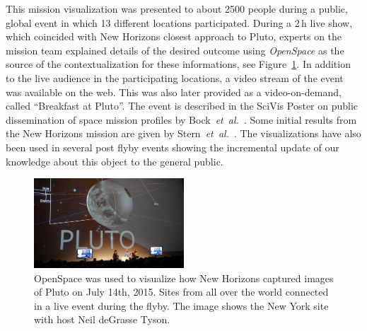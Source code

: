 \documentclass[journal]{vgtc}                %
\newcommand{\alexcomment}[1]{\textbf{[-Alex-~}
    \textcolor{magenta}{#1}
    \textbf{~]}}
\newcommand{\fig}[1]{Figure~\ref{fig:#1}}
\newcommand{\etal}{\emph{et~al.}}
\begin{document}
This mission visualization was presented to about 2500 people during a public, global event in which 13 different locations participated.
During a 2\,h live show, which coincided with New Horizons closest approach to Pluto, experts on the mission team explained details of the desired outcome using \emph{OpenSpace} as the source of the contextualization for these informations, see \fig{frustum_mars}.
In addition to the live audience in the participating locations, a video stream of the event was available on the web. This was also later provided as a video-on-demand, called ``Breakfast at Pluto''.
The event is described in the SciVis Poster on public dissemination of space mission profiles by Bock~\etal~\cite{Bock_2015}.
Some initial results from the New Horizons mission are given by Stern~\etal~\cite{stern2015pluto}.
The visualizations have also been used in several post flyby events showing the incremental update of our knowledge about this object to the general public.

\begin{figure}[b]
\vspace*{-5mm}
    \centering
    	\includegraphics[width=0.5\textwidth]{figures/breakfast.jpg}
        \caption{OpenSpace was used to visualize how New Horizons captured images of Pluto on July 14th, 2015. Sites from all over the world connected in a live event during the flyby. The image shows the New York site with host Neil deGrasse Tyson.}\vspace*{-2mm}
    \label{fig:frustum_mars}
\end{figure}


\end{document}
